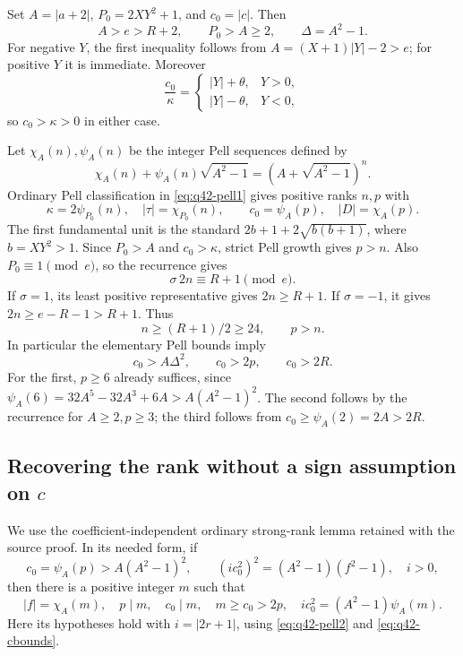 Set $A=|a+2|$, $P_0=2XY^2+1$, and $c_0=|c|$. Then
\[
 A>e>R+2,\qquad P_0>A\ge2,\qquad \Delta=A^2-1.
\]
For negative $Y$, the first inequality follows from
$A=(X+1)|Y|-2>e$; for positive $Y$ it is immediate. Moreover
\[
 \frac{c_0}{\kappa}=
 \begin{cases}
 |Y|+\theta,&Y>0,\\
 |Y|-\theta,&Y<0,
 \end{cases}
\]
so $c_0>\kappa>0$ in either case.

Let $\chi_A(n),\psi_A(n)$ be the integer Pell sequences defined by
\[
 \chi_A(n)+\psi_A(n)\sqrt{A^2-1}
       =(A+\sqrt{A^2-1})^n.
\]
Ordinary Pell classification in \eqref{eq:q42-pell1} gives positive
ranks $n,p$ with
\begin{equation}
 \kappa=2\psi_{P_0}(n),\quad |\tau|=\chi_{P_0}(n),
 \qquad c_0=\psi_A(p),\quad |D|=\chi_A(p).
 \label{eq:q42-ranks}
\end{equation}
The first fundamental unit is the standard
$2b+1+2\sqrt{b(b+1)}$, where $b=XY^2>1$.
Since $P_0>A$ and $c_0>\kappa$, strict Pell growth gives $p>n$.
Also $P_0\equiv1\pmod e$, so the recurrence gives
\begin{equation}
 \sigma\,2n\equiv R+1\pmod e.
 \label{eq:q42-signedindex}
\end{equation}
If $\sigma=1$, its least positive representative gives $2n\ge R+1$.
If $\sigma=-1$, it gives $2n\ge e-R-1>R+1$. Thus
\[
 n\ge(R+1)/2\ge24,\qquad p>n.
\]
In particular the elementary Pell bounds imply
\begin{equation}
 c_0>A\Delta^2,\qquad c_0>2p,\qquad c_0>2R.
 \label{eq:q42-cbounds}
\end{equation}
For the first, $p\ge6$ already suffices, since
$\psi_A(6)=32A^5-32A^3+6A>A(A^2-1)^2$. The second follows by the
recurrence for $A\ge2,p\ge3$; the third follows from
$c_0\ge\psi_A(2)=2A>2R$.

\subsection{Recovering the rank without a sign assumption on \texorpdfstring{$c$}{c}}

We use the coefficient-independent ordinary strong-rank lemma retained
with the source proof. In its needed form, if
\[
 c_0=\psi_A(p)>A(A^2-1)^2,
 \qquad (i c_0^2)^2=(A^2-1)(f^2-1),\quad i>0,
\]
then there is a positive integer $m$ such that
\begin{equation}
 |f|=\chi_A(m),\quad p\mid m,\quad c_0\mid m,
 \quad m\ge c_0>2p,
 \quad i c_0^2=(A^2-1)\psi_A(m).
 \label{eq:q42-strong}
\end{equation}
Here its hypotheses hold with $i=|2r+1|$, using
\eqref{eq:q42-pell2} and \eqref{eq:q42-cbounds}.

